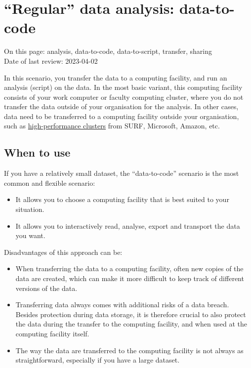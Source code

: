 \documentclass[
]{book}
\providecommand{\tightlist}{%
  \setlength{\itemsep}{0pt}\setlength{\parskip}{0pt}}
\begin{document}
\hypertarget{data-to-code}{%
\section{``Regular'' data analysis: data-to-code}\label{data-to-code}}

On this page: analysis, data-to-code, data-to-script, transfer, sharing\\
Date of last review: 2023-04-02

In this scenario, you transfer the data to a computing facility, and run an
analysis (script) on the data.
In the most basic variant, this computing facility consists of your work
computer or faculty computing cluster, where you do not transfer the data
outside of your organisation for the analysis. In other cases, data need to
be transferred to a computing facility outside your organisation, such as
\href{https://www.uu.nl/en/research/research-data-management/tools-services/software-and-computing/high-performance-and-cloud-computing}{high-performance clusters}
from SURF, Microsoft, Amazon, etc.

\hypertarget{when-to-use}{%
\subsection{When to use}\label{when-to-use}}

If you have a relatively small dataset, the ``data-to-code'' scenario is the most
common and flexible scenario:

\begin{itemize}
\tightlist
\item
  It allows you to choose a computing facility that is best suited to your
  situation.\\
\item
  It allows you to interactively read, analyse, export and transport the data
  you want.
\end{itemize}

Disadvantages of this approach can be:

\begin{itemize}
\tightlist
\item
  When transferring the data to a computing facility, often new copies of the
  data are created, which can make it more difficult to keep track of different
  versions of the data.
\item
  Transferring data always comes with additional risks of a data breach. Besides
  protection during data storage, it is therefore crucial to also protect the data
  during the transfer to the computing facility, and when used at the computing
  facility itself.\\
\item
  The way the data are transferred to the computing facility is not always as
  straightforward, especially if you have a large dataset.
\end{itemize}
\end{document}
